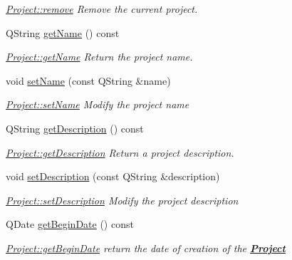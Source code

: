 \begin{DoxyCompactItemize}
\begin{DoxyCompactList}\small\item\em \hyperlink{classModels_1_1Project_ab55c71c009ae796e7dbe03017fed67ee}{Project\+::remove} Remove the current project. \end{DoxyCompactList}\item 
Q\+String \hyperlink{classModels_1_1Project_a11d3b85bdc38daba928bfbfd962a0e32}{get\+Name} () const 
\begin{DoxyCompactList}\small\item\em \hyperlink{classModels_1_1Project_a11d3b85bdc38daba928bfbfd962a0e32}{Project\+::get\+Name} Return the project name. \end{DoxyCompactList}\item 
void \hyperlink{classModels_1_1Project_ac5ffa6ff6d31647fd880881257f47889}{set\+Name} (const Q\+String \&name)
\begin{DoxyCompactList}\small\item\em \hyperlink{classModels_1_1Project_ac5ffa6ff6d31647fd880881257f47889}{Project\+::set\+Name} Modify the project {\itshape name} \end{DoxyCompactList}\item 
Q\+String \hyperlink{classModels_1_1Project_a065b9cd68962c78302a84c686e10ae13}{get\+Description} () const 
\begin{DoxyCompactList}\small\item\em \hyperlink{classModels_1_1Project_a065b9cd68962c78302a84c686e10ae13}{Project\+::get\+Description} Return a project description. \end{DoxyCompactList}\item 
void \hyperlink{classModels_1_1Project_a2cccaca77bff95f13b3320f3f03dc9e7}{set\+Description} (const Q\+String \&description)
\begin{DoxyCompactList}\small\item\em \hyperlink{classModels_1_1Project_a2cccaca77bff95f13b3320f3f03dc9e7}{Project\+::set\+Description} Modify the project {\itshape description} \end{DoxyCompactList}\item 
Q\+Date \hyperlink{classModels_1_1Project_a31b8e46aabb1327499f7e36f170900e3}{get\+Begin\+Date} () const 
\begin{DoxyCompactList}\small\item\em \hyperlink{classModels_1_1Project_a31b8e46aabb1327499f7e36f170900e3}{Project\+::get\+Begin\+Date} return the date of creation of the {\bfseries \hyperlink{classModels_1_1Project}{Project}} \end{DoxyCompactList}\item 

\end{DoxyCompactItemize}
